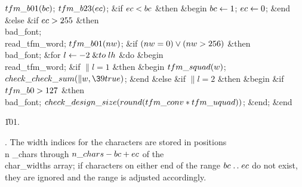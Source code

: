$\\{tfm\_b01}(\\{bc})$;\5
$\\{tfm\_b23}(\\{ec})$;\6
\&{if} $\\{ec}<\\{bc}$ \1\&{then}\6
\&{begin} $\\{bc}\K1$;\5
$\\{ec}\K0$;\6
\&{end}\6
\4\&{else} \&{if} $\\{ec}>255$ \1\&{then}\5
\\{bad\_font};\2\2\6
\\{read\_tfm\_word};\5
$\\{tfm\_b01}(\\{nw})$;\6
\&{if} $(\\{nw}=0)\V(\\{nw}>256)$ \1\&{then}\5
\\{bad\_font};\2\6
\&{for} $\|l\K-2\mathrel{\&{to}}\\{lh}$ \1\&{do}\6
\&{begin} \\{read\_tfm\_word};\6
\&{if} $\|l=1$ \1\&{then}\6
\&{begin} $\\{tfm\_squad}(\|w)$;\5
$\\{check\_check\_sum}(\|w,\39\\{true})$;\6
\&{end}\6
\4\&{else} \&{if} $\|l=2$ \1\&{then}\6
\&{begin} \&{if} $\\{tfm\_b0}>127$ \1\&{then}\5
\\{bad\_font};\2\6
$\\{check\_design\_size}(\\{round}(\\{tfm\_conv}\ast\\{tfm\_uquad}))$;\6
\&{end};\2\2\6
\&{end}\2\par
\U101.\fi

. The width indices for the characters are stored in positions \\{n%
\_chars}
through $\\{n\_chars}-\\{bc}+\\{ec}$ of the \\{char\_widths} array; if
characters on
either end of the range $\\{bc}\to\\{ec}$ do not exist, they are ignored and
the
range is adjusted accordingly.

